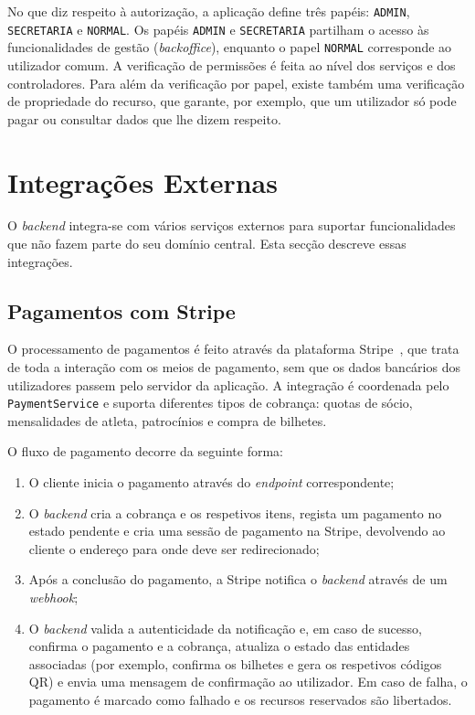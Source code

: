 No que diz respeito à autorização, a aplicação define três papéis: 
\texttt{ADMIN}, \texttt{SECRETARIA} e \texttt{NORMAL}. Os papéis 
\texttt{ADMIN} e \texttt{SECRETARIA} partilham o acesso às funcionalidades de 
gestão (\textit{backoffice}), enquanto o papel \texttt{NORMAL} corresponde ao 
utilizador comum. A verificação de permissões é feita ao nível dos serviços e 
dos controladores. Para além da verificação por papel, existe também uma 
verificação de propriedade do recurso, que garante, por exemplo, que um 
utilizador só pode pagar ou consultar dados que lhe dizem respeito.

\section{Integrações Externas}
\label{sec:integracoes}

O \textit{backend} integra-se com vários serviços externos para suportar 
funcionalidades que não fazem parte do seu domínio central. Esta secção 
descreve essas integrações.

\subsection{Pagamentos com Stripe}

O processamento de pagamentos é feito através da plataforma Stripe~\cite{stripe}, 
que trata de toda a interação com os meios de pagamento, sem que os dados 
bancários dos utilizadores passem pelo servidor da aplicação. A integração é 
coordenada pelo \texttt{PaymentService} e suporta diferentes tipos de cobrança: 
quotas de sócio, mensalidades de atleta, patrocínios e compra de bilhetes.

O fluxo de pagamento decorre da seguinte forma:

\begin{enumerate}
    \item O cliente inicia o pagamento através do \textit{endpoint} 
    correspondente;
    \item O \textit{backend} cria a cobrança e os respetivos itens, regista um 
    pagamento no estado pendente e cria uma sessão de pagamento na Stripe, 
    devolvendo ao cliente o endereço para onde deve ser redirecionado;
    \item Após a conclusão do pagamento, a Stripe notifica o \textit{backend} 
    através de um \textit{webhook};
    \item O \textit{backend} valida a autenticidade da notificação e, em caso 
    de sucesso, confirma o pagamento e a cobrança, atualiza o estado das 
    entidades associadas (por exemplo, confirma os bilhetes e gera os 
    respetivos códigos QR) e envia uma mensagem de confirmação ao utilizador. 
    Em caso de falha, o pagamento é marcado como falhado e os recursos 
    reservados são libertados.
\end{enumerate}

